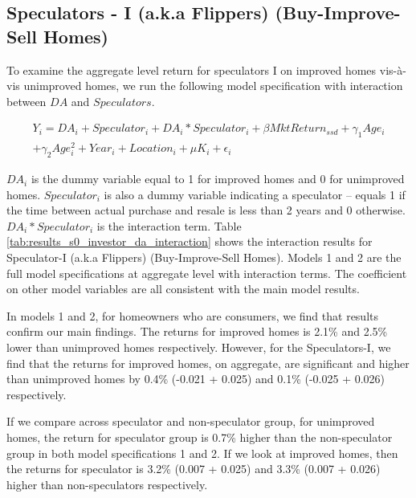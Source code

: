 \documentclass[AEJ,reqno, draftmode]{AEA} %
\begin{document}
\subsection{Speculators - I (a.k.a Flippers) (Buy-Improve-Sell Homes)}

To examine the aggregate level return for speculators I on improved homes vis-à-vis unimproved homes, we run the following model specification with interaction between $DA$ and $Speculators$. 

\begin{equation} \label{eq: spec I}
\begin{aligned}
    Y_i = DA_i + Speculator_i + DA_i * Speculator_i + \beta{MktReturn_{ssd}} + \gamma_1{Age_i}\\ + \gamma_2{Age_i^2} + Year_i + Location_i + \mu{K_i} + \epsilon_i
\end{aligned}
\end{equation}

$DA_i$ is the dummy variable equal to 1 for improved homes and 0 for unimproved homes. $Speculator_i$ is also a dummy variable indicating a speculator -- equals 1 if the time between actual purchase and resale is less than 2 years and 0 otherwise. $DA_i*Speculator_i$ is the interaction term. Table \ref{tab:results_s0_investor_da_interaction} shows the interaction results for Speculator-I (a.k.a Flippers) (Buy-Improve-Sell Homes). Models 1 and 2 are the full model specifications at aggregate level with interaction terms. The coefficient on other model variables are all consistent with the main model results.

In models 1 and 2, for homeowners who are consumers, we find that results confirm our main findings. The returns for improved homes is 2.1\% and 2.5\% lower than unimproved homes respectively. However, for the Speculators-I, we find that the returns for improved homes, on aggregate, are significant and higher than unimproved homes by 0.4\% (-0.021 + 0.025) and 0.1\% (-0.025 + 0.026) respectively.



\restoregeometry


If we compare across speculator and non-speculator group, for unimproved homes, the return for speculator group is 0.7\% higher than the non-speculator group in both model specifications 1 and 2. If we look at improved homes, then the returns for speculator is 3.2\% (0.007 + 0.025) and 3.3\% (0.007 + 0.026) higher than non-speculators respectively.
\end{document}
